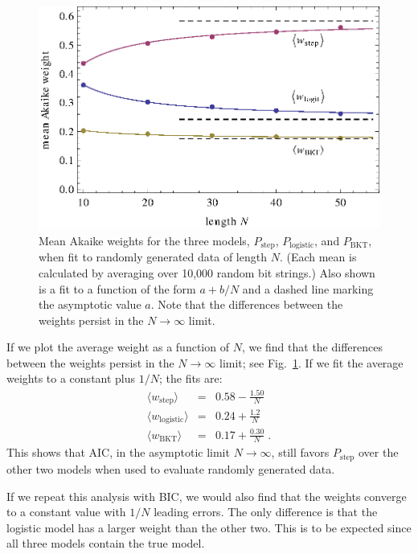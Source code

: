 \documentclass{acmlarge-edm}
\begin{document}
\begin{figure}
   \centering\includegraphics{mean-weights.eps}
  \caption{Mean Akaike weights for the three models, 
   $P_\mathrm{step}$, $P_\mathrm{logistic}$, and $P_\mathrm{BKT}$, 
   when fit to randomly generated data of length $N$.
   (Each mean is calculated by averaging over 10,000 random bit strings.)
   Also shown is a fit to a function of the form $a+b/N$ and
   a dashed line marking the asymptotic value $a$.
   Note that the differences between the weights persist
   in the $N\to\infty$ limit.}\label{meanweight}
\end{figure}

If we plot the average weight as a function of $N$, we find
that the differences between the weights persist
in the $N\to\infty$ limit;  see Fig.~\ref{meanweight}.
If we fit the average weights to a constant plus $1/N$;
the fits are:
%
\begin{eqnarray}
 \langle w_\mathrm{step}\rangle &=& 0.58 - \frac{1.50}{N} \\
 \langle w_\mathrm{logistic}\rangle &=& 0.24 + \frac{1.2}{N} \\
 \langle w_\mathrm{BKT}\rangle &=& 0.17+\frac{0.30}{N} \; .
\end{eqnarray}
%
This shows that AIC, in the asymptotic limit $N\to\infty$, 
still favors  $P_\mathrm{step}$ over the other two models
when used to evaluate randomly generated data.

If we repeat this analysis with BIC, we would also
find that the weights converge to a constant value with 
$1/N$ leading errors.  The only difference is that the logistic
model has a larger weight than the other two.  This is to be
expected since all three models contain the true model.
\end{document}

